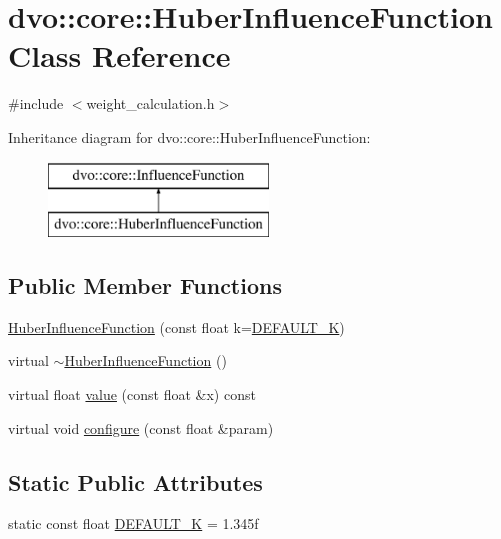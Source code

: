 \hypertarget{classdvo_1_1core_1_1_huber_influence_function}{}\section{dvo\+:\+:core\+:\+:Huber\+Influence\+Function Class Reference}
\label{classdvo_1_1core_1_1_huber_influence_function}


{\ttfamily \#include $<$weight\+\_\+calculation.\+h$>$}

Inheritance diagram for dvo\+:\+:core\+:\+:Huber\+Influence\+Function\+:\begin{figure}[H]
\begin{center}
\leavevmode
\includegraphics[height=2.000000cm]{classdvo_1_1core_1_1_huber_influence_function}
\end{center}
\end{figure}
\subsection*{Public Member Functions}
\begin{DoxyCompactItemize}
\item 
\mbox{\hyperlink{classdvo_1_1core_1_1_huber_influence_function_aa881a4af638bdc2ecc8ca2b653f4a04b}{Huber\+Influence\+Function}} (const float k=\mbox{\hyperlink{classdvo_1_1core_1_1_huber_influence_function_a7298db77700e394a56fafbf20da229fc}{D\+E\+F\+A\+U\+L\+T\+\_\+K}})
\item 
virtual \mbox{\hyperlink{classdvo_1_1core_1_1_huber_influence_function_ab243ee7b88189c9232372e316179f111}{$\sim$\+Huber\+Influence\+Function}} ()
\item 
virtual float \mbox{\hyperlink{classdvo_1_1core_1_1_huber_influence_function_af41e9e57eedcd25db690a1f41f3d6c8a}{value}} (const float \&x) const
\item 
virtual void \mbox{\hyperlink{classdvo_1_1core_1_1_huber_influence_function_aab5a25ad6f632e829c8ad2ccf073fdec}{configure}} (const float \&param)
\end{DoxyCompactItemize}
\subsection*{Static Public Attributes}
\begin{DoxyCompactItemize}
\item 
static const float \mbox{\hyperlink{classdvo_1_1core_1_1_huber_influence_function_a7298db77700e394a56fafbf20da229fc}{D\+E\+F\+A\+U\+L\+T\+\_\+K}} = 1.\+345f
\end{DoxyCompactItemize}


